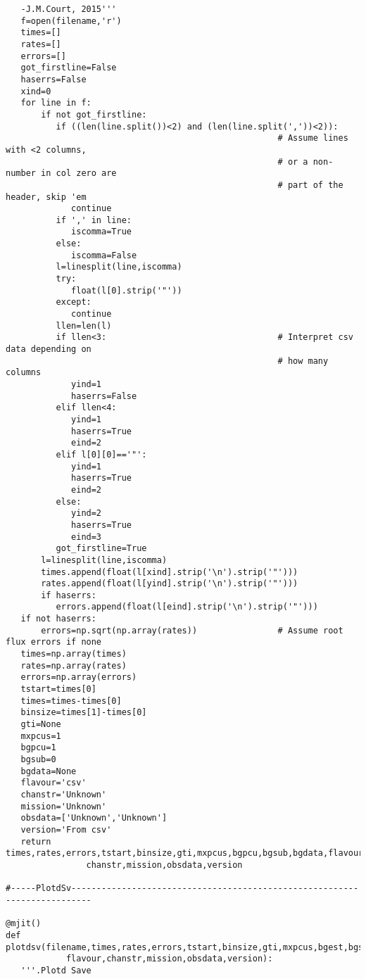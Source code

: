 \begin{verbatim}
   -J.M.Court, 2015'''
   f=open(filename,'r')
   times=[]
   rates=[]
   errors=[]
   got_firstline=False
   haserrs=False
   xind=0
   for line in f:
       if not got_firstline:
          if ((len(line.split())<2) and (len(line.split(','))<2)):
                                                      # Assume lines with <2 columns,
                                                      # or a non-number in col zero are
                                                      # part of the header, skip 'em
             continue
          if ',' in line:
             iscomma=True
          else:
             iscomma=False
          l=linesplit(line,iscomma)
          try:
             float(l[0].strip('"'))
          except:
             continue
          llen=len(l)
          if llen<3:                                  # Interpret csv data depending on
                                                      # how many columns
             yind=1
             haserrs=False
          elif llen<4:
             yind=1
             haserrs=True
             eind=2
          elif l[0][0]=='"':
             yind=1
             haserrs=True
             eind=2
          else:
             yind=2
             haserrs=True
             eind=3
          got_firstline=True
       l=linesplit(line,iscomma)
       times.append(float(l[xind].strip('\n').strip('"')))
       rates.append(float(l[yind].strip('\n').strip('"')))
       if haserrs:
          errors.append(float(l[eind].strip('\n').strip('"')))
   if not haserrs:
       errors=np.sqrt(np.array(rates))                # Assume root flux errors if none
   times=np.array(times)
   rates=np.array(rates)
   errors=np.array(errors)
   tstart=times[0]
   times=times-times[0]
   binsize=times[1]-times[0]
   gti=None
   mxpcus=1
   bgpcu=1
   bgsub=0
   bgdata=None
   flavour='csv'
   chanstr='Unknown'
   mission='Unknown'
   obsdata=['Unknown','Unknown']
   version='From csv'
   return times,rates,errors,tstart,binsize,gti,mxpcus,bgpcu,bgsub,bgdata,flavour,
                chanstr,mission,obsdata,version

#-----PlotdSv--------------------------------------------------------------------------

@mjit()
def plotdsv(filename,times,rates,errors,tstart,binsize,gti,mxpcus,bgest,bgsub,bgdata,
            flavour,chanstr,mission,obsdata,version):
   '''.Plotd Save


\end{verbatim}
